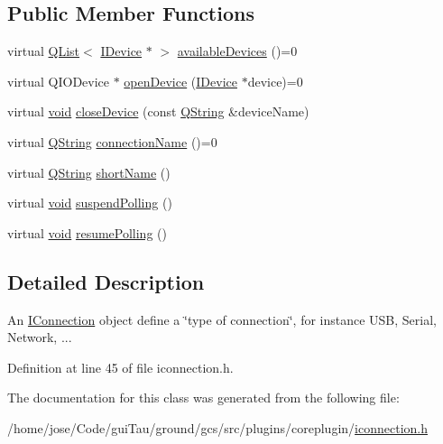 \subsection*{Public Member Functions}
\begin{DoxyCompactItemize}
\item 
virtual \hyperlink{class_q_list}{Q\-List}$<$ \hyperlink{class_core_1_1_i_device}{I\-Device} $\ast$ $>$ \hyperlink{group___core_plugin_ga2766d577d1343dfbd7f41859363cad29}{available\-Devices} ()=0
\item 
virtual Q\-I\-O\-Device $\ast$ \hyperlink{group___core_plugin_ga9fa3de80c2899c62813961082ad48e95}{open\-Device} (\hyperlink{class_core_1_1_i_device}{I\-Device} $\ast$device)=0
\item 
virtual \hyperlink{group___u_a_v_objects_plugin_ga444cf2ff3f0ecbe028adce838d373f5c}{void} \hyperlink{group___core_plugin_ga5264be67cf0d9ca62aae564737389b1d}{close\-Device} (const \hyperlink{group___u_a_v_objects_plugin_gab9d252f49c333c94a72f97ce3105a32d}{Q\-String} \&device\-Name)
\item 
virtual \hyperlink{group___u_a_v_objects_plugin_gab9d252f49c333c94a72f97ce3105a32d}{Q\-String} \hyperlink{group___core_plugin_ga65bb74489e016d9863f42f0bb87afd8c}{connection\-Name} ()=0
\item 
virtual \hyperlink{group___u_a_v_objects_plugin_gab9d252f49c333c94a72f97ce3105a32d}{Q\-String} \hyperlink{group___core_plugin_gad436df0a83378128cb8034d83e6734f0}{short\-Name} ()
\item 
virtual \hyperlink{group___u_a_v_objects_plugin_ga444cf2ff3f0ecbe028adce838d373f5c}{void} \hyperlink{group___core_plugin_gac0a12e1d5a84be9528ce09595b424438}{suspend\-Polling} ()
\item 
virtual \hyperlink{group___u_a_v_objects_plugin_ga444cf2ff3f0ecbe028adce838d373f5c}{void} \hyperlink{group___core_plugin_gae3937027985048723454f1ad7d118d1a}{resume\-Polling} ()
\end{DoxyCompactItemize}


\subsection{Detailed Description}
An \hyperlink{class_core_1_1_i_connection}{I\-Connection} object define a \char`\"{}type of connection\char`\"{}, for instance U\-S\-B, Serial, Network, ... 

Definition at line 45 of file iconnection.\-h.



The documentation for this class was generated from the following file\-:\begin{DoxyCompactItemize}
\item 
/home/jose/\-Code/gui\-Tau/ground/gcs/src/plugins/coreplugin/\hyperlink{iconnection_8h}{iconnection.\-h}\end{DoxyCompactItemize}
